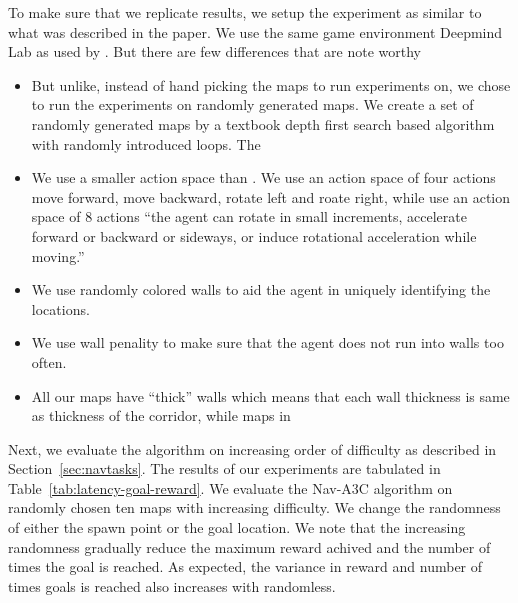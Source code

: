 To make sure that we replicate \cite{MiPaViICLR2017} results, we setup the experiment as similar to what was described in the paper. We use the same game environment Deepmind Lab \cite{BeLeTeARXIV2016} as used by \cite{MiPaViICLR2017}. But there are few differences that are note worthy
\begin{itemize}
\item But unlike, \cite{MiPaViICLR2017} instead of hand picking the maps to run experiments on, we chose to run the experiments on randomly generated maps.
We create a set of randomly generated maps by a textbook depth first search based algorithm with randomly introduced loops. The 
\item We use a smaller action space than \cite{MiPaViICLR2017}. We use an action space of four actions move forward, move backward, rotate left and roate right, while \cite{MiPaViICLR2017} use an action space of 8 actions ``the agent can rotate in small increments, accelerate forward or backward or
sideways, or induce rotational acceleration while moving.''
\item We use randomly colored walls to aid the agent in uniquely identifying the locations.
\item We use wall penality to make sure that the agent does not run into walls too often.
\item All our maps have ``thick'' walls which means that each wall thickness is same as thickness of the corridor, while maps in \cite{MiPaViICLR2017}
\end{itemize}

Next, we evaluate the algorithm on increasing order of difficulty as described in Section~\ref{sec:navtasks}. The results of our experiments are tabulated in Table~\ref{tab:latency-goal-reward}.
We evaluate the Nav-A3C\cite{MiPaViICLR2017} algorithm on randomly chosen ten maps with increasing difficulty.
We change the randomness of either the spawn point or the goal location.
We note that the increasing randomness gradually reduce the maximum reward achived and the number of times the goal is reached. As expected, the variance in reward and number of times goals is reached also increases with randomless.

